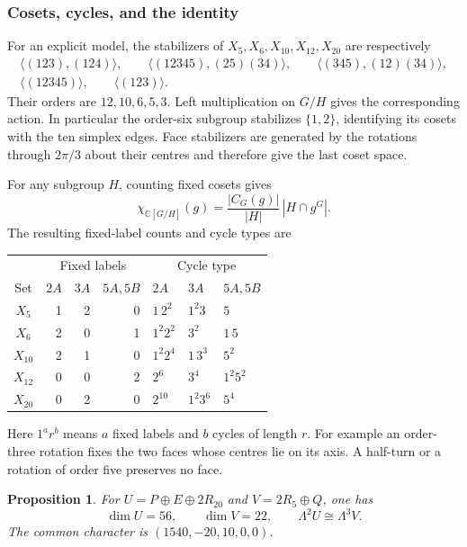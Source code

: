 \documentclass[11pt,a4paper]{article}
\newtheorem{proposition}{Proposition}[section]
\begin{document}
\subsubsection*{Cosets, cycles, and the identity}

For an explicit model, the stabilizers of $X_5,X_6,X_{10},X_{12},X_{20}$
are respectively
\[
\begin{gathered}
\langle(123),(124)\rangle,\qquad
\langle(12345),(25)(34)\rangle,\qquad
\langle(345),(12)(34)\rangle,\\
\langle(12345)\rangle,\qquad \langle(123)\rangle.
\end{gathered}
\]
Their orders are $12,10,6,5,3$. Left multiplication on $G/H$ gives the
corresponding action. In particular the order-six subgroup stabilizes
$\{1,2\}$, identifying its cosets with the ten simplex edges. Face
stabilizers are generated by the rotations through $2\pi/3$ about their
centres and therefore give the last coset space.

For any subgroup $H$, counting fixed cosets gives
\[
\chi_{\mathbb C[G/H]}(g)
=\frac{|C_G(g)|}{|H|}\,|H\cap g^G|.
\]
The resulting fixed-label counts and cycle types are
\begin{center}\small
\begin{tabular}{c|rrr|lll}
\toprule
&\multicolumn{3}{c|}{Fixed labels}&\multicolumn{3}{c}{Cycle type}\\
Set&$2A$&$3A$&$5A,5B$&$2A$&$3A$&$5A,5B$\\\midrule
$X_5$&1&2&0&$1\,2^2$&$1^2 3$&$5$\\
$X_6$&2&0&1&$1^2 2^2$&$3^2$&$1\,5$\\
$X_{10}$&2&1&0&$1^2 2^4$&$1\,3^3$&$5^2$\\
$X_{12}$&0&0&2&$2^6$&$3^4$&$1^2 5^2$\\
$X_{20}$&0&2&0&$2^{10}$&$1^2 3^6$&$5^4$\\\bottomrule
\end{tabular}
\end{center}
Here $1^a r^b$ means $a$ fixed labels and $b$ cycles of length $r$.
For example an order-three rotation fixes the two faces whose centres lie
on its axis. A half-turn or a rotation of order five preserves no face.

\begin{proposition}\label{prop:faces-identity}
For $U=P\oplus E\oplus2R_{20}$ and $V=2R_5\oplus Q$, one has
\[
\dim U=56,\qquad\dim V=22,\qquad
\Lambda^2U\cong\Lambda^3V.
\]
The common character is $(1540,-20,10,0,0)$.
\end{proposition}
\end{document}
